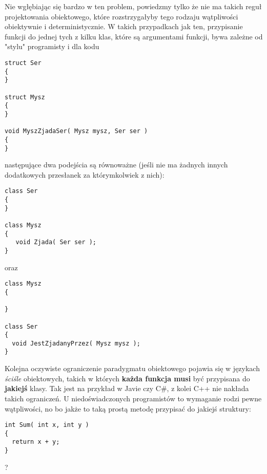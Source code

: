 Nie wgłębiając się bardzo w ten problem, powiedzmy tylko że nie ma takich reguł projektowania obiektowego, które rozstrzygałyby
tego rodzaju wątpliwości obiektywnie i deterministycznie. W takich przypadkach jak ten, przypisanie funkcji do jednej tych 
z kilku klas, które są argumentami funkcji, bywa zależne od "stylu" programisty i dla kodu

\begin{scriptsize}
\begin{verbatim}
struct Ser
{
}

struct Mysz
{
}

void MyszZjadaSer( Mysz mysz, Ser ser )
{
}
\end{verbatim}
\end{scriptsize}

następujące dwa podejścia są równoważne
(jeśli nie ma żadnych innych dodatkowych przesłanek za którymkolwiek z nich):

\begin{scriptsize}
\begin{verbatim}
class Ser
{
}

class Mysz
{
   void Zjada( Ser ser );  
}
\end{verbatim}
\end{scriptsize}

oraz

\begin{scriptsize}
\begin{verbatim}
class Mysz
{
  
}

class Ser
{
  void JestZjadanyPrzez( Mysz mysz );
}
\end{verbatim}
\end{scriptsize}

Kolejna oczywiste ograniczenie paradygmatu obiektowego pojawia się w językach {\em ściśle} obiektowych, 
takich w których {\bf każda funkcja musi} być przypisana do {\bf jakiejś} klasy. Tak jest na przykład w Javie czy C\#,
z kolei C++ nie nakłada takich ograniczeń. U niedoświadczonych programistów to wymaganie rodzi pewne wątpliwości,
no bo jakże to taką prostą metodę przypisać do jakiejś struktury:

\begin{scriptsize}
\begin{verbatim}
int Sum( int x, int y )
{
  return x + y;
}
\end{verbatim}
\end{scriptsize}

?

